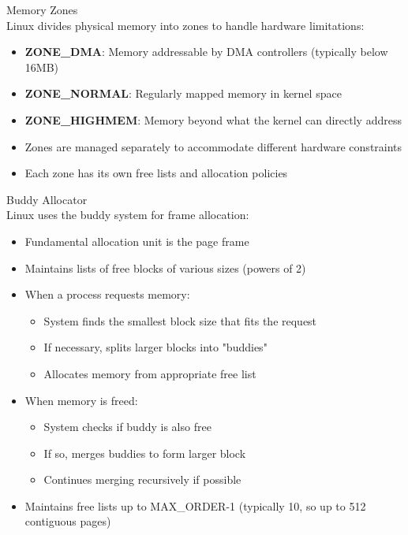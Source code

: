 \begin{definition}{Memory Zones}\\
    Linux divides physical memory into zones to handle hardware limitations:
    \begin{itemize}
        \item \textbf{ZONE\_DMA}: Memory addressable by DMA controllers (typically below 16MB)
        \item \textbf{ZONE\_NORMAL}: Regularly mapped memory in kernel space
        \item \textbf{ZONE\_HIGHMEM}: Memory beyond what the kernel can directly address
        \item Zones are managed separately to accommodate different hardware constraints
        \item Each zone has its own free lists and allocation policies
    \end{itemize}
\end{definition}

\begin{definition}{Buddy Allocator}\\
    Linux uses the buddy system for frame allocation:
    \begin{itemize}
        \item Fundamental allocation unit is the page frame
        \item Maintains lists of free blocks of various sizes (powers of 2)
        \item When a process requests memory:
            \begin{itemize}
                \item System finds the smallest block size that fits the request
                \item If necessary, splits larger blocks into "buddies"
                \item Allocates memory from appropriate free list
            \end{itemize}
        \item When memory is freed:
            \begin{itemize}
                \item System checks if buddy is also free
                \item If so, merges buddies to form larger block
                \item Continues merging recursively if possible
            \end{itemize}
        \item Maintains free lists up to MAX\_ORDER-1 (typically 10, so up to 512 contiguous pages)
    \end{itemize}
\end{definition}


